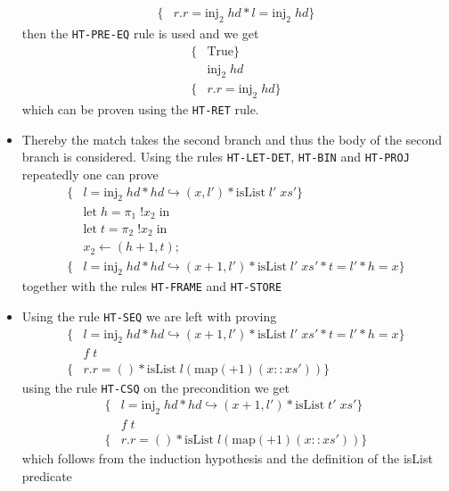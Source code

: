 \begin{itemize}
\begin{align*}
    \{&r.r = \text{inj}_2 \; hd * l = \text{inj}_2 \; hd \}
  \end{align*}
  then the \texttt{HT-PRE-EQ} rule is used and we get
  \begin{align*}
    \{&\text{True}\} \\
        &\text{inj}_2 \; hd \\
    \{&r.r = \text{inj}_2 \; hd \} 
  \end{align*}
  which can be proven using the \texttt{HT-RET} rule.
  \item Thereby the match takes the second branch and thus the body of the second branch is considered. Using the rules \texttt{HT-LET-DET}, \texttt{HT-BIN} and \texttt{HT-PROJ} repeatedly one can prove
  \begin{align*}
    \{&l = \text{inj}_2 \; hd * hd \hookrightarrow (x, l') * \text{isList} \; l' \; xs' \} \\
      &\text{let} \; h= \pi_1 \; !x_2 \; \text{in} \\
      &\text{let} \; t = \pi_2 \; !x_2 \; \text{in} \\
      &x_2 \leftarrow (h+1, t); \\
    \{&l = \text{inj}_2 \; hd * hd \hookrightarrow (x + 1, l') * \text{isList} \; l' \; xs' * t = l' * h = x\} 
  \end{align*} 
  together with the rules \texttt{HT-FRAME} and \texttt{HT-STORE}
  \item Using the rule \texttt{HT-SEQ} we are left with proving
  \begin{align*}
    \{&l = \text{inj}_2 \; hd * hd \hookrightarrow (x + 1, l') * \text{isList} \; l' \; xs' * t = l' * h = x\} \\
      & f \; t \\
    \{&r.r = () * \text{isList} \; l (\text{map}(+1)(x::xs'))\}
  \end{align*}
  using the rule \texttt{HT-CSQ} on the precondition we get
  \begin{align*}
    \{&l = \text{inj}_2 \; hd * hd \hookrightarrow (x + 1, l') * \text{isList} \; t' \; xs' \} \\
      & f \; t \\
    \{&r.r = () * \text{isList} \; l (\text{map}(+1)(x::xs'))\}
  \end{align*}
  which follows from the induction hypothesis and the definition of the isList predicate
\end{itemize}

\newpage

